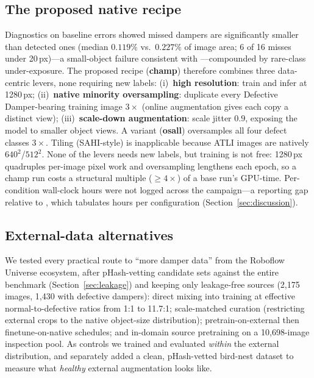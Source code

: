\documentclass[conference]{IEEEtran}
\newcommand{\dd}{Defective Damper}
\begin{document}
\subsection{The proposed native recipe}
\label{sec:recipe}
Diagnostics on baseline errors showed missed dampers are significantly smaller than detected ones (median $0.119\%$ vs.\ $0.227\%$ of image area; 6 of 16 misses under 20\,px)---a small-object failure consistent with \cite{vieiraesilva2021stnplad,tao2020insulator}---compounded by rare-class under-exposure. The proposed recipe (\textbf{champ}) therefore combines three data-centric levers, none requiring new labels: (i)~\textbf{high resolution}: train and infer at 1280\,px; (ii)~\textbf{native minority oversampling}: duplicate every \dd{}-bearing training image $3\times$ (online augmentation gives each copy a distinct view); (iii)~\textbf{scale-down augmentation}: scale jitter $0.9$, exposing the model to smaller object views. A variant (\textbf{osall}) oversamples all four defect classes $3\times$. Tiling (SAHI-style) is inapplicable because ATLI images are natively $640^2$/$512^2$. None of the levers needs new labels, but training is not free: 1280\,px quadruples per-image pixel work and oversampling lengthens each epoch, so a champ run costs a structural multiple (${\geq}4\times$) of a base run's GPU-time. Per-condition wall-clock hours were not logged across the campaign---a reporting gap relative to \cite{tsai2025atli}, which tabulates hours per configuration (Section~\ref{sec:discussion}).

\subsection{External-data alternatives}
\label{sec:extmethods}
We tested every practical route to ``more damper data'' from the Roboflow Universe ecosystem, after pHash-vetting candidate sets against the entire benchmark (Section~\ref{sec:leakage}) and keeping only leakage-free sources (2{,}175 images, 1{,}430 with defective dampers): direct mixing into training at effective normal-to-defective ratios from 1:1 to 11.7:1; scale-matched curation (restricting external crops to the native object-size distribution); pretrain-on-external then finetune-on-native schedules; and in-domain source pretraining on a 10{,}698-image inspection pool. As controls we trained and evaluated \emph{within} the external distribution, and separately added a clean, pHash-vetted bird-nest dataset to measure what \emph{healthy} external augmentation looks like.
\end{document}
